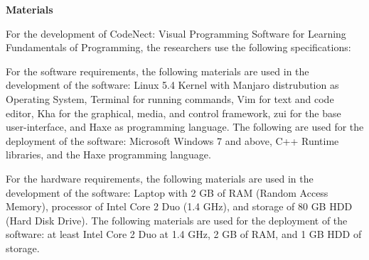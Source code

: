 \flushleft
\textbf{Materials}\\
\justifying

\parx
For the development of CodeNect: Visual Programming Software for Learning
Fundamentals of Programming, the researchers use the following specifications:

\parx
For the software requirements, the following materials are used in the
development of the software: Linux 5.4 Kernel with Manjaro distrubution as
Operating System, Terminal for running commands, Vim for text and code editor,
Kha for the graphical, media, and control framework, zui for the base
user-interface, and Haxe as programming language. The following are used for the
deployment of the software: Microsoft Windows 7 and above, C++ Runtime
libraries, and the Haxe programming language.

\parx
For the hardware requirements, the following materials are used in the
development of the software: Laptop with 2 GB of RAM (Random Access Memory),
processor of Intel Core 2 Duo (1.4 GHz), and storage of 80 GB HDD (Hard Disk
Drive). The following materials are used for the deployment of the software: at
least Intel Core 2 Duo at 1.4 GHz, 2 GB of RAM, and 1 GB HDD of storage.
